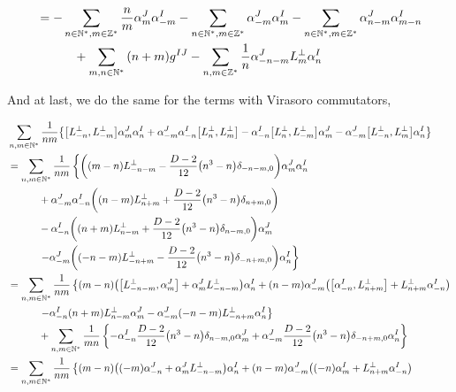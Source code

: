\begin{align*}
    &=-\sum\limits_{n\in\mathbb N^\ast,m\in\mathbb Z^\ast}\frac{n}{m}\alpha^J_{m}\alpha^I_{-m}-\sum\limits_{n\in\mathbb N^\ast,m\in\mathbb Z^\ast}\alpha^J_{-m}\alpha^I_{m}-\sum\limits_{n\in\mathbb N^\ast,m\in\mathbb Z^\ast}\alpha^J_{n-m}\alpha^I_{m-n}\\
    &\quad\quad\quad+\sum\limits_{m,n\in\mathbb N^\ast}\qty(n+m)g^{IJ}-\sum\limits_{n,m\in\mathbb Z^\ast}\frac1n\alpha^J_{-n-m}L^\perp_m\alpha^I_{n}
\end{align*}

And at last, we do the same for the terms with Virasoro commutators,

\begin{align*}
    &\sum\limits_{n,m\in\mathbb N^\ast}\frac{1}{nm}\qty{\comm{L^\perp_{-n}}{L^\perp_{-m}}\alpha^J_m\alpha^I_n+\alpha^J_{-m}\alpha^I_{-n}\comm{L^\perp_n}{L^\perp_m}-\alpha_{-n}^I\comm{L_n^\perp}{L_{-m}^\perp}\alpha_m^J-\alpha_{-m}^J\comm{L^\perp_{-n}}{L^\perp_m}\alpha^I_n}\\
    &=\sum\limits_{n,m\in\mathbb N^\ast}\frac{1}{nm}\left\{\qty(\qty(m-n)L^\perp_{-n-m}-\frac{D-2}{12}\qty(n^3-n)\delta_{-n-m,0})\alpha^J_m\alpha^I_n\right.\\
    &\quad\quad\quad+\alpha^J_{-m}\alpha^I_{-n}\qty(\qty(n-m)L^\perp_{n+m}+\frac{D-2}{12}\qty(n^3-n)\delta_{n+m,0})\\
    &\quad\quad\quad-\alpha_{-n}^I\qty(\qty(n+m)L^\perp_{n-m}+\frac{D-2}{12}\qty(n^3-n)\delta_{n-m,0})\alpha_m^J\\
    &\quad\quad\quad\left.-\alpha_{-m}^J\qty(\qty(-n-m)L^\perp_{-n+m}-\frac{D-2}{12}\qty(n^3-n)\delta_{-n+m,0})\alpha^I_n\right\}\\
    &=\sum\limits_{n,m\in\mathbb N^\ast}\frac{1}{nm}\left\{\qty(m-n)\qty(\comm{L^\perp_{-n-m}}{\alpha^J_m}+\alpha^J_mL^\perp_{-n-m})\alpha^I_n+\qty(n-m)\alpha^J_{-m}\qty(\comm{\alpha^I_{-n}}{L^\perp_{n+m}}+L^\perp_{n+m}\alpha^I_{-n})\right.\\
    &\quad\quad\quad\left.-\alpha_{-n}^I\qty(n+m)L^\perp_{n-m}\alpha^J_m-\alpha_{-m}^J\qty(-n-m)L^\perp_{-n+m}\alpha^I_n\right\}\\
    &\quad\quad\quad+\sum\limits_{n,m\in\mathbb N^\ast}\frac{1}{mn}\left\{-\alpha_{-n}^I\frac{D-2}{12}\qty(n^3-n)\delta_{n-m,0}\alpha_m^J+\alpha_{-m}^J\frac{D-2}{12}\qty(n^3-n)\delta_{-n+m,0}\alpha^I_n\right\}\\
    &=\sum\limits_{n,m\in\mathbb N^\ast}\frac{1}{nm}\left\{\qty(m-n)\qty(\qty(-m)\alpha^J_{-n}+\alpha^J_mL^\perp_{-n-m})\alpha^I_n+\qty(n-m)\alpha^J_{-m}\qty(\qty(-n)\alpha^I_{m}+L^\perp_{n+m}\alpha^I_{-n})\right.\\

\end{align*}
